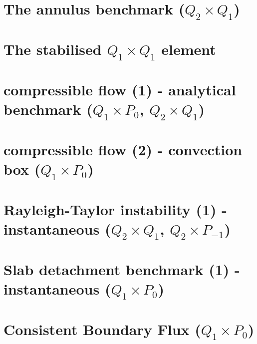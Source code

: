 \documentclass[a4paper,11pt]{report}
\begin{document}
\chapter{The annulus benchmark ($Q_2\times Q_1$) \label{f21}} %

\chapter{The stabilised $Q_1 \times Q_1$ element \label{f22}} %

\chapter{compressible flow (1) - analytical benchmark ($Q_1\times P_0$, $Q_2\times Q_1$)\label{f23}} %

\chapter{compressible flow (2) - convection box ($Q_1\times P_0$)\label{f24}} %

\chapter{Rayleigh-Taylor instability (1) - instantaneous ($Q_2\times Q_1$, $Q_2\times P_{-1}$)\label{f25}} %

\chapter{Slab detachment benchmark (1) - instantaneous ($Q_1\times P_0$)\label{f26}} %

\chapter{Consistent Boundary Flux ($Q_1\times P_0$)\label{f27}} %
\end{document}

